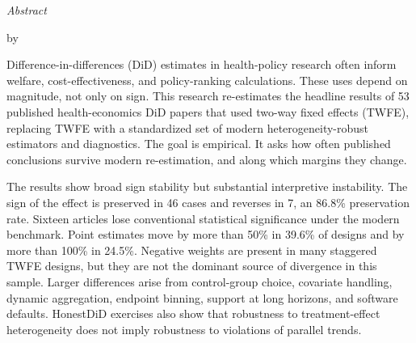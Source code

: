 \documentclass[12pt,oneside]{MastersDoctoralThesis_dry_en}
\begin{document}
\clearpage
{}
\addchaptertocentry{\abstractname}
\thispagestyle{plain}

\vspace*{0.8cm}

\begin{center}
{\small\scshape \univname\par}

\vspace{0.6cm}

{\Large\itshape Abstract\par}

\vspace{0.5cm}

{\bfseries \ttitle\par}

\vspace{0.3cm}

by \authorname
\end{center}

\vspace{0.8cm}

\noindent
Difference-in-differences (DiD) estimates in health-policy research often inform welfare, cost-effectiveness, and policy-ranking calculations. These uses depend on magnitude, not only on sign. This research re-estimates the headline results of 53 published health-economics DiD papers that used two-way fixed effects (TWFE), replacing TWFE with a standardized set of modern heterogeneity-robust estimators and diagnostics. The goal is empirical. It asks how often published conclusions survive modern re-estimation, and along which margins they change.

\medskip

\noindent
The results show broad sign stability but substantial interpretive instability. The sign of the effect is preserved in 46 cases and reverses in 7, an 86.8\% preservation rate. Sixteen articles lose conventional statistical significance under the modern benchmark. Point estimates move by more than 50\% in 39.6\% of designs and by more than 100\% in 24.5\%. Negative weights are present in many staggered TWFE designs, but they are not the dominant source of divergence in this sample. Larger differences arise from control-group choice, covariate handling, dynamic aggregation, endpoint binning, support at long horizons, and software defaults. HonestDiD exercises also show that robustness to treatment-effect heterogeneity does not imply robustness to violations of parallel trends.

\medskip
\end{document}
